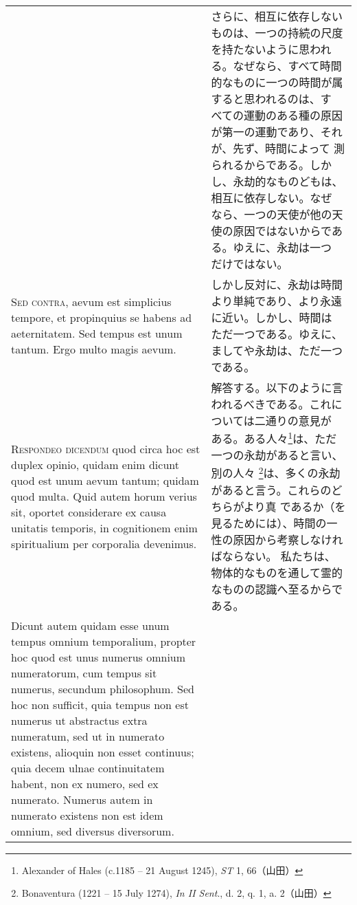 \documentclass[10pt]{jsarticle} %
\begin{document}
\begin{longtable}{p{21em}p{21em}}
&

さらに、相互に依存しないものは、一つの持続の尺度を持たないように思われ
る。なぜなら、すべて時間的なものに一つの時間が属すると思われるのは、す
べての運動のある種の原因が第一の運動であり、それが、先ず、時間によって
測られるからである。しかし、永劫的なものどもは、相互に依存しない。なぜ
なら、一つの天使が他の天使の原因ではないからである。ゆえに、永劫は一つ
だけではない。

\\



{\scshape Sed contra}, aevum est simplicius tempore, et propinquius se habens ad
aeternitatem. Sed tempus est unum tantum. Ergo multo magis aevum.
&

しかし反対に、永劫は時間より単純であり、より永遠に近い。しかし、時間は
ただ一つである。ゆえに、ましてや永劫は、ただ一つである。



\\



{\scshape Respondeo dicendum} quod circa hoc est duplex opinio, quidam enim dicunt
quod est unum aevum tantum; quidam quod multa. Quid autem horum verius
sit, oportet considerare ex causa unitatis temporis, in cognitionem enim
spiritualium per corporalia devenimus. 

&

解答する。以下のように言われるべきである。これについては二通りの意見が
ある。ある人々\footnote{Alexander of Hales (c.1185 -- 21 August 1245),
{\it ST} 1, 66（山田）}は、ただ一つの永劫があると言い、別の人々
\footnote{Bonaventura (1221 -- 15 July 1274), {\it In II Sent}., d. 2,
q. 1, a. 2（山田）}は、多くの永劫があると言う。これらのどちらがより真
であるか（を見るためには）、時間の一性の原因から考察しなければならない。
私たちは、物体的なものを通して霊的なものの認識へ至るからである。

\\


Dicunt autem quidam esse unum tempus omnium temporalium, propter hoc
quod est unus numerus omnium numeratorum, cum tempus sit numerus,
secundum philosophum.  Sed hoc non sufficit, quia tempus non est
numerus ut abstractus extra numeratum, sed ut in numerato existens,
alioquin non esset continuus; quia decem ulnae continuitatem habent,
non ex numero, sed ex numerato. Numerus autem in numerato existens non
est idem omnium, sed diversus diversorum.

&


\end{longtable}
\end{document}
